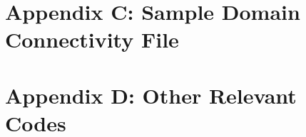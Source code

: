 \documentclass[twocolumn,10pt]{asme2ej}
\begin{document}
\section*{Appendix C: Sample Domain Connectivity File}


\clearpage
\section*{Appendix D: Other Relevant Codes}







%

%

%

\end{document}
